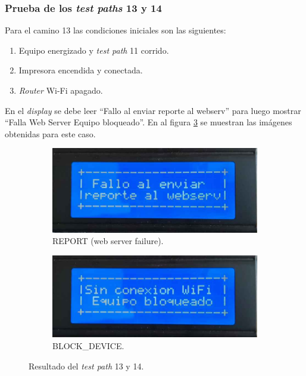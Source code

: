 \subsubsection{Prueba de los \textit{test paths} 13 y 14}
\label{subsubsec:pruRepor_13}

Para el camino 13 las condiciones iniciales son las siguientes:
\begin{enumerate}
	\item Equipo energizado y \textit{test path} 11 corrido.
	\item Impresora encendida y conectada.
	\item \textit{Router} Wi-Fi apagado.
\end{enumerate}

En el \textit{display} se debe leer ``Fallo al enviar reporte al webserv'' para luego mostrar ``Falla Web Server Equipo bloqueado''. En al figura \ref{fig:pruConf_13_res} se muestran las imágenes obtenidas para este caso.

\begin{figure}[!htpb]
     \centering
     \begin{subfigure}[b]{0.4\textwidth}
         \centering
         \includegraphics[width=1.1\textwidth]{./Figures/falla_web_server.jpeg}
         \caption{REPORT (web server failure).}
         \label{fig:pruConf_13_1}
     \end{subfigure}
          \hfill
     \begin{subfigure}[b]{0.4\textwidth}
         \centering
         \includegraphics[width=1.1\textwidth]{./Figures/Sin_Conex_WiFi_Eq_Bloq.jpeg}
         \caption{BLOCK\_DEVICE.}
         \label{fig:pruConf_13_2}
     \end{subfigure}
        \caption{Resultado del \textit{test path} 13 y 14.}
        \label{fig:pruConf_13_res}
\end{figure}

